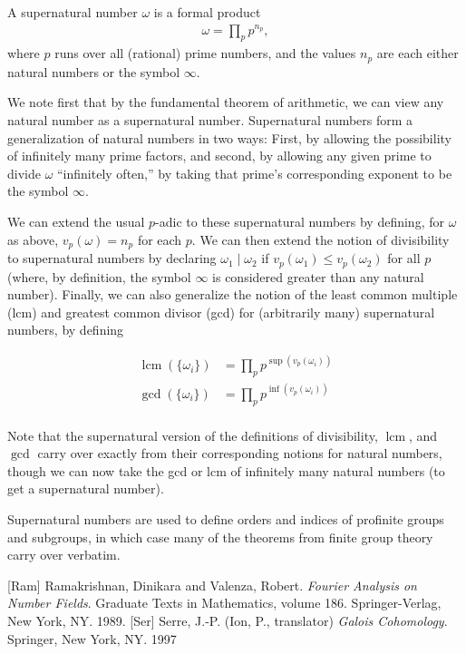 \documentclass[12pt]{article}
\newcommand{\<}{\langle}
\renewcommand{\>}{\rangle}
\begin{document}
A supernatural number $\omega$ is a formal product 
\begin{align*}
\omega=\prod_{p} p^{n_p},
\end{align*}
where $p$ runs over all (rational) prime numbers, and the values $n_p$ are each either natural numbers or the symbol $\infty$.

We note first that by the fundamental theorem of arithmetic, we can view any natural number as a supernatural number.  Supernatural numbers form a generalization of natural numbers in two ways:  First, by allowing the possibility of infinitely many prime factors, and second, by allowing any given prime to divide $\omega$ ``infinitely often,'' by taking that prime's corresponding exponent to be the symbol $\infty$.

We can extend the usual $p$-adic  to these supernatural numbers by defining, for $\omega$ as above, $v_p(\omega)=n_p$ for each $p$.  We can then extend the notion of divisibility to supernatural numbers by declaring $\omega_1\mid\omega_2$ if $v_p(\omega_1)\leq v_p(\omega_2)$ for all $p$ (where, by definition, the symbol $\infty$ is considered greater than any natural number).  Finally, we can also generalize the notion of the least common multiple (lcm) and greatest common divisor (gcd) for (arbitrarily many) supernatural numbers, by defining

\begin{align*}
\operatorname{lcm}(\{\omega_i\})&=\prod_p p^{\sup(v_p(\omega_i))}\\
\operatorname{gcd}(\{\omega_i\})&=\prod_p p^{\inf(v_p(\omega_i))}\\
\end{align*}

Note that the supernatural version of the definitions of divisibility, $\operatorname{lcm}$, and $\operatorname{gcd}$ carry over exactly from their corresponding notions for natural numbers, though we can now take the gcd or lcm of infinitely many natural numbers (to get a supernatural number).

Supernatural numbers are used to define orders and indices of profinite groups and subgroups, in which case many of the theorems from finite group theory carry over verbatim.

\begin{thebibliography}{9}
[Ram] Ramakrishnan, Dinikara and Valenza, Robert.  \emph{Fourier Analysis on Number Fields}.  Graduate Texts in Mathematics, volume 186.  Springer-Verlag, New York, NY.  1989.
[Ser] Serre, J.-P.  (Ion, P., translator)  \emph{Galois Cohomology}.  Springer, New York, NY.  1997
\end{thebibliography}
\end{document}
